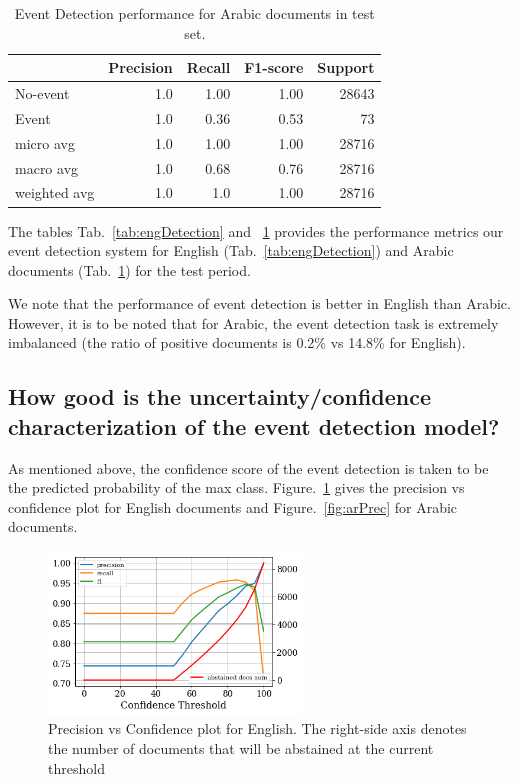 \begin{table}
    \centering
   \begin{tabular}{lrrrr}
\toprule
{} &  Precision &  Recall &    F1-score &  Support \\
\midrule
No-event            &  1.0 &  1.00 &  1.00 &  28643 \\
Event               &  1.0 &  0.36 &  0.53 &   73 \\
micro avg           &  1.0 &  1.00 &  1.00 &  28716 \\
macro avg           &  1.0 &  0.68 &  0.76 &  28716 \\
weighted avg        &  1.0 &  1.0  &  1.00 &  28716 \\
\bottomrule
\end{tabular}
    \caption{Event Detection performance for Arabic documents in test set.}
    \label{tab:arDetection}
\end{table}

The tables Tab.~\ref{tab:engDetection} and ~\ref{tab:arDetection} provides the performance metrics our event detection system for English (Tab.~\ref{tab:engDetection}) and Arabic documents (Tab.~\ref{tab:arDetection}) for the test period.

We note that the performance of event detection is better in English than Arabic. However, it is to be noted that for Arabic, the event detection task is extremely imbalanced (the ratio of positive documents is 0.2\% vs 14.8\% for English). 


\subsection{How good is the uncertainty/confidence characterization of the event detection model?}
As mentioned above, the confidence score of  the event detection is taken to be the predicted probability of the max class. Figure.~\ref{fig:engPrec} gives the precision vs confidence plot for English documents and Figure.~\ref{fig:arPrec} for Arabic documents.

\begin{figure}
    \centering
    \includegraphics[width=0.6\textwidth]{figures/english_precConf.png}
    \caption{Precision vs Confidence plot for English. The right-side axis denotes the number of documents that will be abstained at the current threshold}
    \label{fig:engPrec}
\end{figure}

